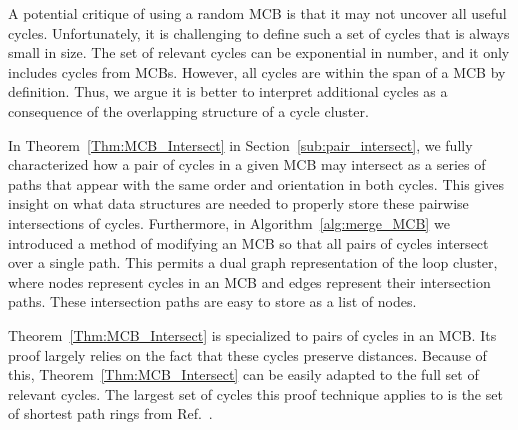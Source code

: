 \documentclass[fleqn,11pt]{article}
\begin{document}
A potential critique of using a random MCB is that it may not uncover all useful cycles.
Unfortunately, it is challenging to define such a set of cycles that is always small in size. 
The set of relevant cycles can be exponential in number, and it only includes cycles from MCBs. 
However, all cycles are within the span of a MCB by definition.
Thus, we argue it is better to interpret additional cycles as a consequence of the overlapping structure of a cycle cluster.

In Theorem~\ref{Thm:MCB_Intersect} in Section~\ref{sub:pair_intersect}, we fully characterized how a pair of cycles in a given MCB may intersect as a series of paths that appear with the same order and orientation in both cycles. This gives insight on what data structures are needed to properly store these pairwise intersections of cycles. Furthermore, in Algorithm~\ref{alg:merge_MCB} we introduced a method of modifying an MCB so that all pairs of cycles intersect over a single path. This permits a dual graph representation of the loop cluster, where nodes represent cycles in an MCB and edges represent their intersection paths.
These intersection paths are easy to store as a list of nodes.

Theorem~\ref{Thm:MCB_Intersect} is specialized to pairs of cycles in an MCB. Its proof largely relies on the fact that these cycles preserve distances. Because of this, Theorem~\ref{Thm:MCB_Intersect} can be easily adapted to the full set of relevant cycles. The largest set of cycles this proof technique applies to is the set of shortest path rings from Ref.~\cite{franzblau1991computation}.

\end{document}
